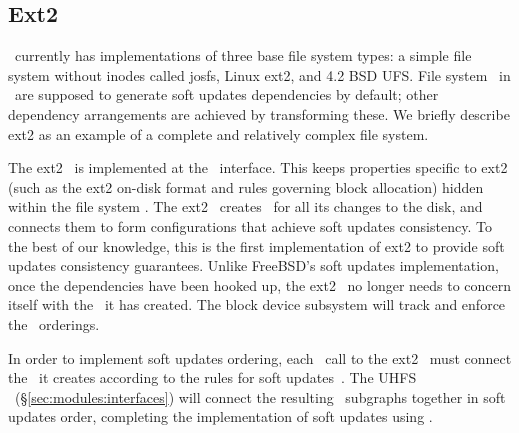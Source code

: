 \subsection{Ext2}
\label{sec:modules:ext2}

\Kudos\ currently has implementations of three base file system types: a simple
file system without inodes called josfs, Linux ext2, and 4.2 BSD UFS. File
system \modules\ in \Kudos\ are supposed to generate soft updates dependencies
by default; other dependency arrangements are achieved by transforming these.
We briefly describe ext2 as an example of a complete and relatively complex file
system.

The ext2 \module\ is implemented at the \LFS\ interface. This keeps properties
specific to ext2 (such as the ext2 on-disk format and rules governing block
allocation) hidden within the file system \module. The ext2 \module\ creates
\patches\ for all its changes to the disk, and connects them to form
configurations that achieve soft updates consistency. To the best of our
knowledge, this is the first implementation of ext2 to provide soft updates
consistency guarantees. Unlike FreeBSD's soft updates implementation, once the
dependencies have been hooked up, the ext2 \module\ no longer needs to concern
itself with the \patches\ it has created. The block device subsystem will track
and enforce the \patch\ orderings.

In order to implement soft updates ordering, each \LFS\ call to the ext2
\module\ must connect the \patches\ it creates according to the rules for soft
updates~\cite{ganger00soft}. The UHFS \module\ (\S\ref{sec:modules:interfaces})
will connect the resulting \patch\ subgraphs together in soft updates order,
completing the implementation of soft updates using \patches.
